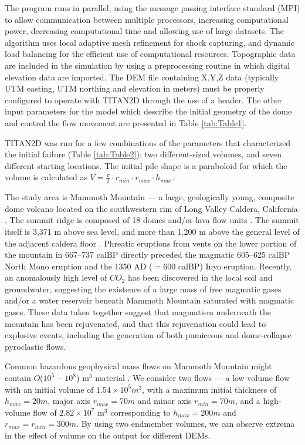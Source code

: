 \documentclass[12pt,letterpaper]{article}
\begin{document}
The program runs in parallel, using the message passing interface
standard (MPI) to allow communication between multiple processors,
increasing computational power, decreasing computational time and
allowing use of large datasets. The algorithm uses local adaptive mesh
refinement for shock capturing, and dynamic load balancing for the
efficient use of computational resources. Topographic data are
included in the simulation by using a preprocessing routine in which
digital elevation data are imported. The DEM file containing X,Y,Z
data (typically UTM easting, UTM northing and elevation in meters)
must be properly configured to operate with TITAN2D through the use of
a header.
The other input parameters for the model which describe the initial 
geometry of the dome and control the flow movement are presented in Table \ref{tab:Table1}.

TITAN2D was run for a few combinations of the parameters that characterized the 
 initial failure (Table \ref{tab:Table2}): two different-sized volumes, and seven
different starting locations. The initial pile shape is a paraboloid
for which the volume is calculated as $V=\frac{\pi}{2}\cdot r_{min}\cdot r_{max} \cdot h_{max}$.

 The study area is Mammoth Mountain --- a large, geologically
  young, composite dome volcano located on the southwestern rim of
  Long Valley Caldera, California \citep{Bailey1989}. The summit ridge
  is composed of 18 domes and/or lava flow units
  \citep{Burkett2007}. The summit itself is 3,371 m above sea level,
  and more than 1,200 m above the general level of the adjacent
  caldera floor \citep{Farrar1995}.  Phreatic eruptions from vents on
  the lower portion of the mountain in 667--737 calBP 
  directly preceded the magmatic 605--625 calBP North Mono eruption
  and the 1350 AD ($= 600$ calBP) Inyo eruption. Recently, an 
  anomalously high level of $CO_2$ has
  been discovered in the local soil and groundwater, suggesting the
  existence of a large mass of free magmatic gases and/or a water
  reservoir beneath Mammoth Mountain saturated with magmatic gases.
  These data taken together suggest that magmatism
  underneath the mountain has been rejuvenated, and that this
  rejuvenation could lead to explosive events, including the
  generation of both pumiceous and dome-collapse pyroclastic flows.

Common hazardous geophysical mass flows on Mammoth Mountain might
contain $O$($10^5 - 10^8$) m$^3$ material \citep{Patra2005,
Burkett2007}. We consider two flows --- a low-volume flow with an
initial volume of $1.54 \times 10^5 m^3$, with a maximum initial
thickness of $h_{max}= 20m$, major axis $r_{max} = 70m$ and minor axis
$r_{min} = 70m $, and a high-volume flow of $2.82 \times 10^7$ m$^3$
corresponding to $h_{max} = 200m$ and $r_{max} = r_{min} = 300m$.  By
using two endmember volumes, we can observe extrema in the effect of
volume on the output for different DEMs.
\end{document}
